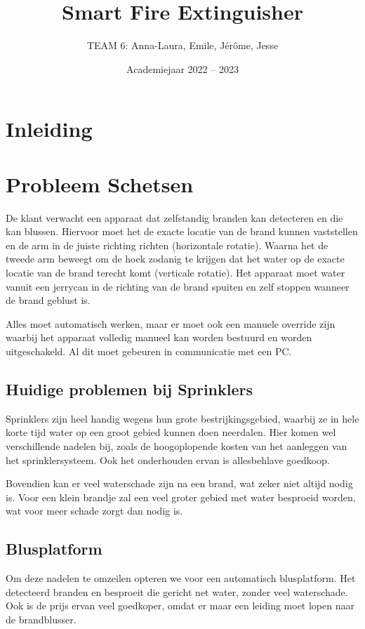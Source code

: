 \documentclass[kulak]{kulakarticle} %
\title{Smart Fire Extinguisher}
\author{TEAM 6: Anna-Laura, Emile, Jérôme, Jesse}
\date{Academiejaar 2022 -- 2023}
\begin{document}
	
	\maketitle
	
	
	
	\section*{Inleiding}
	\section{Probleem Schetsen}
	
	De klant verwacht een apparaat dat zelfstandig branden kan detecteren en die kan blussen. Hiervoor moet het de exacte locatie van de brand kunnen vaststellen en de arm in de juiste richting richten (horizontale rotatie). Waarna het de tweede arm beweegt om de hoek zodanig te krijgen dat het water op de exacte locatie van de brand terecht komt (verticale rotatie). Het apparaat moet water vanuit een jerrycan in de richting van de brand spuiten en zelf stoppen wanneer de brand geblust is. 
	
	Alles moet automatisch werken, maar er moet ook een manuele override zijn waarbij het apparaat volledig manueel kan worden bestuurd en worden uitgeschakeld. Al dit moet gebeuren in communicatie met een PC. 
	
	
	\subsection{Huidige problemen bij Sprinklers}
	
	Sprinklers zijn heel handig wegens hun grote bestrijkingsgebied, waarbij ze in hele korte tijd water op een groot gebied kunnen doen neerdalen. Hier komen wel verschillende nadelen bij, zoals de hoogoplopende kosten van het aanleggen van het sprinklersysteem. Ook het onderhouden ervan is allesbehlave goedkoop. 
	
	Bovendien kan er veel waterschade zijn na een brand, wat zeker niet altijd nodig is. Voor een klein brandje zal een veel groter gebied met water besproeid worden, wat voor meer schade zorgt dan nodig is.
	
	
	\subsection{Blusplatform}
	
	Om deze nadelen te omzeilen opteren we voor een automatisch blusplatform. Het detecteerd branden en besproeit die gericht net water, zonder veel waterschade. Ook is de prijs ervan veel goedkoper, omdat er maar een leiding moet lopen naar de brandblusser.
	
\end{document}
